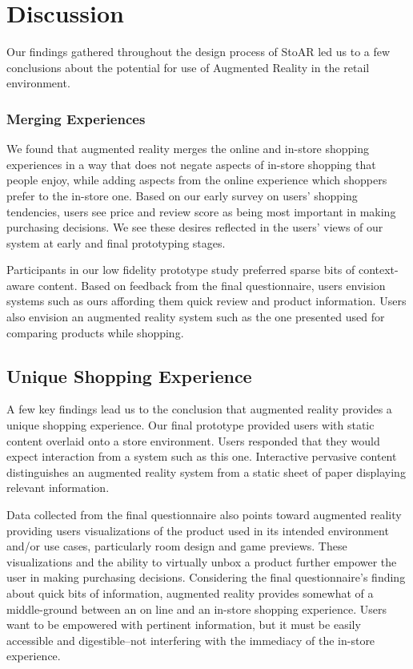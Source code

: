 \section{Discussion}

Our findings gathered throughout the design process of StoAR led us to a few conclusions about the potential for use of Augmented Reality in the retail environment.

\subsubsection{Merging Experiences}
We found that augmented reality merges the online and in-store shopping experiences in a way that does not negate aspects of in-store shopping that people enjoy, while adding aspects from the online experience which shoppers prefer to the in-store one.  Based on our early survey on users' shopping tendencies, users see price and review score as being most important in making purchasing decisions.  We see these desires reflected in the users' views of our system at early and final prototyping stages.

Participants in our low fidelity prototype study preferred sparse bits of context-aware content.  Based on feedback from the final questionnaire, users envision systems such as ours affording them quick review and product information.  Users also envision an augmented reality system such as the one presented used for comparing products while shopping.

\subsection{Unique Shopping Experience}
A few key findings lead us to the conclusion that augmented reality provides a unique shopping experience.  
Our final prototype provided users with static content overlaid onto a store environment.  Users responded that they would expect interaction from a system such as this one.  Interactive pervasive content distinguishes an augmented reality system from a static sheet of paper displaying relevant information.

Data collected from the final questionnaire also points toward augmented reality providing users visualizations of the product used in its intended environment and/or use cases, particularly room design and game previews.  These visualizations and the ability to virtually unbox a product further empower the user in making purchasing decisions.
Considering the final questionnaire's finding about quick bits of information, augmented reality provides somewhat of a middle-ground between an on line and an in-store shopping experience.  Users want to be empowered with pertinent information, but it must be easily accessible and digestible--not interfering with the immediacy of the in-store experience.

